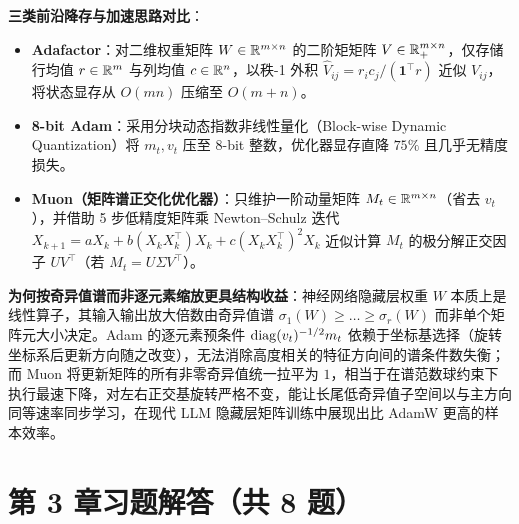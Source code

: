 \textbf{三类前沿降存与加速思路对比}：
\begin{itemize}
  \item \textbf{Adafactor}：对二维权重矩阵 $W \in \mathbb{R}^{m \times n}$ 的二阶矩矩阵 $V \in \mathbb{R}_+^{m \times n}$，仅存储行均值 $r \in \mathbb{R}^m$ 与列均值 $c \in \mathbb{R}^n$，以秩-1 外积 $\hat{V}_{ij} = r_i c_j / (\mathbf{1}^\top r)$ 近似 $V_{ij}$，将状态显存从 $O(mn)$ 压缩至 $O(m+n)$。
  \item \textbf{8-bit Adam}：采用分块动态指数非线性量化（Block-wise Dynamic Quantization）将 $m_t, v_t$ 压至 8-bit 整数，优化器显存直降 $75\%$ 且几乎无精度损失。
  \item \textbf{Muon（矩阵谱正交化优化器）}：只维护一阶动量矩阵 $M_t \in \mathbb{R}^{m\times n}$（省去 $v_t$），并借助 5 步低精度矩阵乘 Newton--Schulz 迭代 $X_{k+1} = a X_k + b (X_k X_k^\top) X_k + c (X_k X_k^\top)^2 X_k$ 近似计算 $M_t$ 的极分解正交因子 $U V^\top$（若 $M_t = U \Sigma V^\top$）。
\end{itemize}
\textbf{为何按奇异值谱而非逐元素缩放更具结构收益}：神经网络隐藏层权重 $W$ 本质上是线性算子，其输入输出放大倍数由奇异值谱 $\sigma_1(W) \ge \dots \ge \sigma_r(W)$ 而非单个矩阵元大小决定。Adam 的逐元素预条件 $\operatorname{diag}(v_t)^{-1/2} m_t$ 依赖于坐标基选择（旋转坐标系后更新方向随之改变），无法消除高度相关的特征方向间的谱条件数失衡；而 Muon 将更新矩阵的所有非零奇异值统一拉平为 $1$，相当于在谱范数球约束下执行最速下降，对左右正交基旋转严格不变，能让长尾低奇异值子空间以与主方向同等速率同步学习，在现代 LLM 隐藏层矩阵训练中展现出比 AdamW 更高的样本效率。

\section*{第 3 章习题解答（共 8 题）}


